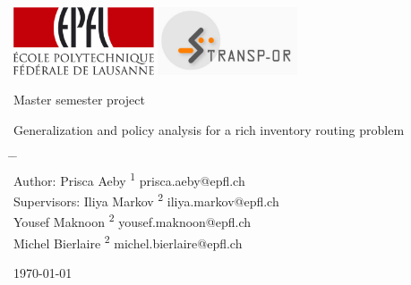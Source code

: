 \documentclass[12pt,a4paper]{article}
\begin{document}
\thispagestyle{empty}

  \vspace{-3cm}
  \includegraphics[height=2cm]{./images/EPFL.pdf}
  \hfill \includegraphics[height=2cm]{./images/TRANSP-OR.pdf}
  
  \hrulefill
  \vspace{3.0cm}

\begin{center}
 Master semester project
 
 \LARGE
 \bigskip
 Generalization and policy analysis for a rich inventory routing problem
\end{center}



\vspace{2.0cm}
\begin{tabbing}
\hspace*{3cm}		\=	\hspace*{4cm}							\=	\hspace*{3cm} \\
Author:			\>	Prisca Aeby		  \textsuperscript{1}	\> prisca.aeby@epfl.ch\\
Supervisors:		\>	Iliya Markov	  \textsuperscript{2}	\> iliya.markov@epfl.ch\\	
					\>	Yousef Maknoon    \textsuperscript{2}	\> yousef.maknoon@epfl.ch\\
					\>	Michel Bierlaire  \textsuperscript{2}	\> michel.bierlaire@epfl.ch\\
\end{tabbing}



\begin{center}

\today
\end{center}
\end{document}
